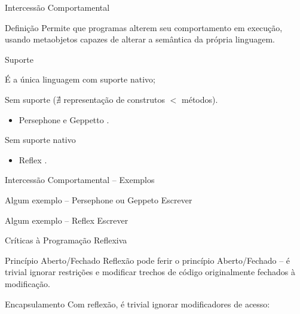 \documentclass[12pt,t]{beamer}
\begin{document}
 	 \begin{frame}{Intercessão Comportamental}
 	 	\begin{block}{Definição  \cite{mostinckx2007mirages}}
 	 		Permite que programas alterem seu comportamento em execução, usando metaobjetos capazes de alterar a semântica da própria linguagem.
 	 	\end{block} 
 	 	\pause		 	 	 	
 		\begin{block}{Suporte}
 			\begin{description}  [Smalltalk:] 
	 			\item [CLOS] É a única linguagem com suporte nativo;
	 			\pause
	 			\item [Smalltalk:] Sem suporte ($\nexists$ representação de construtos $<$ métodos). 
	 			\begin{itemize}
	 				\item Persephone e Geppetto \cite{marschall2006taking,rothlisberger2006geppetto}.
	 			\end{itemize}
	 			\pause
	 			\item [Java:] Sem suporte nativo
	 			\begin{itemize}
	 				\item Reflex \cite{tanter2001reflex}.
	 			\end{itemize}
	 		\end{description}
 	 	\end{block} 	 	 	 	
 	 \end{frame}
 	 \begin{frame}{Intercessão Comportamental -- Exemplos}
 	 	\begin{exampleblock}{Algum exemplo -- Persephone ou Geppeto}
 	 		\alert{Escrever}
 	 	\end{exampleblock}
 	 	\pause
 	 	\begin{exampleblock}{Algum exemplo -- Reflex}
 	 		\alert{Escrever}
 	 	\end{exampleblock}
 	 \end{frame} 	 
 	 \begin{frame}{Críticas à Programação Reflexiva}
 	 	\begin{block}{Princípio Aberto/Fechado}
 	 		Reflexão pode ferir o princípio Aberto/Fechado \cite{meyer1988object} -- é trivial ignorar restrições e modificar trechos de código originalmente fechados à modificação.
 	 	\end{block}
 	 	\pause
 	 	\begin{block}{Encapsulamento}
 	 		Com reflexão, é trivial ignorar modificadores de acesso:
 	 		
 	 	\end{block}
 	 \end{frame}
\end{document}
